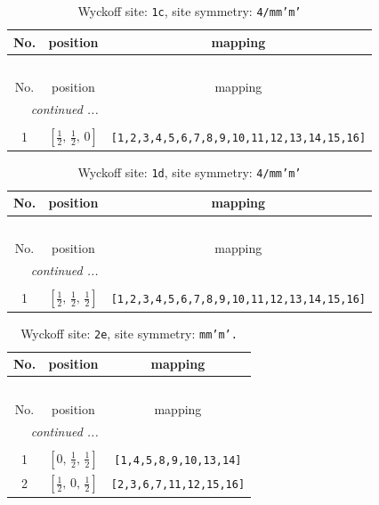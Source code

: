 \documentclass[fleqn,8pt]{jsarticle}
\begin{document}
\begin{longtable}{ccc}
\caption{Wyckoff site: {\tt 1c}, site symmetry: {\tt 4/mm'm'}}
 \\
 \hline \hline
No. & position & mapping \\ \hline \endfirsthead

\multicolumn{2}{l}{\tablename\ \thetable{}} \\
 \hline \hline
No. & position & mapping \\ \hline \endhead

 \hline \hline
\multicolumn{2}{r}{\footnotesize\it continued ...} \\ \endfoot

 \hline \hline
\multicolumn{2}{r}{} \\ \endlastfoot

1 & $\left[ \frac{1}{2},\, \frac{1}{2},\, 0 \right]$ & {\tt [1,2,3,4,5,6,7,8,9,10,11,12,13,14,15,16]} \\
\end{longtable}
\renewcommand{\arraystretch}{1.2}
\begin{longtable}{ccc}
\caption{Wyckoff site: {\tt 1d}, site symmetry: {\tt 4/mm'm'}}
 \\
 \hline \hline
No. & position & mapping \\ \hline \endfirsthead

\multicolumn{2}{l}{\tablename\ \thetable{}} \\
 \hline \hline
No. & position & mapping \\ \hline \endhead

 \hline \hline
\multicolumn{2}{r}{\footnotesize\it continued ...} \\ \endfoot

 \hline \hline
\multicolumn{2}{r}{} \\ \endlastfoot

1 & $\left[ \frac{1}{2},\, \frac{1}{2},\, \frac{1}{2} \right]$ & {\tt [1,2,3,4,5,6,7,8,9,10,11,12,13,14,15,16]} \\
\end{longtable}
\renewcommand{\arraystretch}{1.2}
\begin{longtable}{ccc}
\caption{Wyckoff site: {\tt 2e}, site symmetry: {\tt mm'm'.}}
 \\
 \hline \hline
No. & position & mapping \\ \hline \endfirsthead

\multicolumn{2}{l}{\tablename\ \thetable{}} \\
 \hline \hline
No. & position & mapping \\ \hline \endhead

 \hline \hline
\multicolumn{2}{r}{\footnotesize\it continued ...} \\ \endfoot

 \hline \hline
\multicolumn{2}{r}{} \\ \endlastfoot

1 & $\left[ 0,\, \frac{1}{2},\, \frac{1}{2} \right]$ & {\tt [1,4,5,8,9,10,13,14]} \\ \hline
2 & $\left[ \frac{1}{2},\, 0,\, \frac{1}{2} \right]$ & {\tt [2,3,6,7,11,12,15,16]} \\
\end{longtable}
\end{document}
